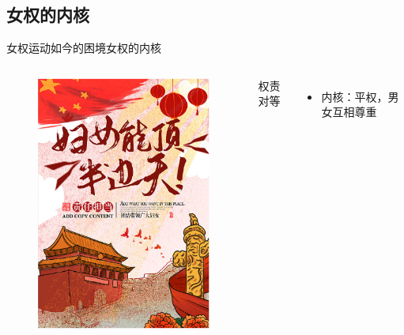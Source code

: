 \documentclass{beamer}
\begin{document}
	\subsection*{女权的内核}
	\begin{frame}{女权运动如今的困境}{女权的内核}
		\begin{columns}
			\begin{figure}
				\centering
				\includegraphics[width=\textwidth]{img/图片6.png}
			\end{figure}
			

			\Huge{权责对等}\\

			\quad\\
			\normalsize
			\begin{itemize}
				\item 内核：平权，男女互相尊重
			\end{itemize}
		\end{columns}
	\end{frame}
\end{document}
